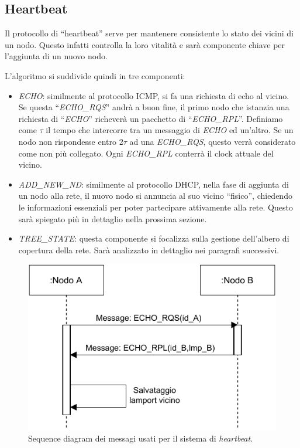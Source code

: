 \documentclass[italian]{memoir}
\begin{document}
\subsection{Heartbeat}\label{heartbeat}
Il protocollo di ``heartbeat'' serve per mantenere consistente lo stato dei vicini
	   di un nodo. Questo infatti controlla la loro vitalità e sarà componente chiave
	   per l'aggiunta di un nuovo nodo.

L'algoritmo si suddivide quindi in tre componenti:
\begin{itemize}
	\item \textit{ECHO}: similmente al protocollo ICMP, si fa una richiesta di echo
	   al vicino. Se questa ``\textit{ECHO\_RQS}'' andrà a buon fine, il primo nodo che
	   istanzia una richiesta di ``\textit{ECHO}'' richeverà un pacchetto di ``\textit{ECHO\_RPL}''.
	   Definiamo come $\tau$ il tempo che intercorre tra un messaggio di \textit{ECHO} ed
	   un'altro. Se un nodo non rispondesse entro $2\tau$ ad una \textit{ECHO\_RQS}, questo
	   verrà considerato come non più collegato. Ogni \textit{ECHO\_RPL} conterrà il clock
	   attuale del vicino.
	\item \textit{ADD\_NEW\_ND}: similmente al protocollo DHCP, nella fase di aggiunta
	   di un nodo alla rete, il nuovo nodo si annuncia al suo vicino ``fisico'', chiedendo
	   le informazioni essenziali per poter partecipare attivamente alla rete. Questo sarà
	   spiegato più in dettaglio nella prossima sezione.
	\item \textit{TREE\_STATE}: questa componente si focalizza sulla gestione dell'albero di copertura della rete.
	Sarà analizzato in dettaglio nei paragrafi successivi.
\end{itemize}

\begin{figure}[H]
\centering
\includegraphics{HeartbeatDiagram.pdf}
\caption{Sequence diagram dei messagi usati per il sistema di \textit{heartbeat}.}
\label{img:heartbeat}
\end{figure}
\end{document}
